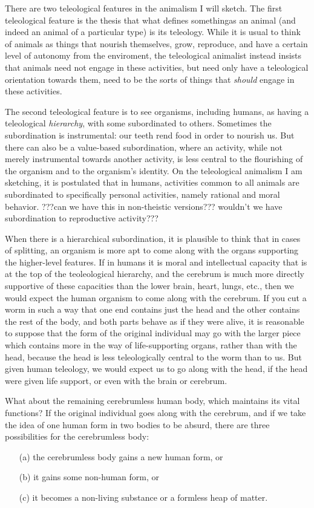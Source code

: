 There are two teleological features in the animalism I will sketch. The first teleological feature is the thesis 
that what defines somethingas an animal (and indeed an animal of a particular type) is its teleology. While it is usual to 
think of animals as things that nourish themselves, grow, reproduce, and have a certain level of autonomy from the enviroment, 
the teleological animalist instead insists that animals need not engage in these activities, but need only have a teleological
orientation towards them, need to be the sorts of things that \textit{should} engage in these activities. 

The second teleological feature is to see organisms, including humans, as having a teleological \textit{hierarchy}, with some
\tele{} subordinated to others. Sometimes the subordination is instrumental: our teeth rend food in order to nourish us. 
But there can also be a value-based subordination, where an activity, while not merely instrumental towards another activity, 
is less central to the flourishing of the organism and to the organism's identity. On the teleological animalism I am sketching,
it is postulated that in humans, activities common to all animals are subordinated to specifically personal activities, namely 
rational and moral behavior. ???can we have this in non-theistic versions??? wouldn't we have subordination to reproductive
activity???

When there is a hierarchical subordination, it is plausible to think that in cases of splitting, an organism is more apt
to come along with the organs supporting the higher-level features. If in humans it is moral and intellectual capacity 
that is at the top of the teoleological hierarchy, and the cerebrum is much more directly supportive of these capacities
than the lower brain, heart, lungs, etc., then we would expect the human organism to come along with the cerebrum. If you
cut a worm in such a way that one end contains just the head and the other contains the rest of the body, and both parts
behave as if they were alive, it is reasonable to suppose that the form of the original individual may go with the larger
piece which contains more in the way of life-supporting organs, rather than with the head, because the head is less 
teleologically central to the worm than to us. But given human teleology, we would expect us to go along with the head,
if the head were given life support, or even with the brain or cerebrum.

What about the remaining cerebrumless human body, which maintains its vital functions? If the original individual goes along
with the cerebrum, and if we take the idea of one human form in two bodies to be absurd, there are three possibilities 
for the cerebrumless body:
\begin{itemize}
\item[(a)] the cerebrumless body gains a new human form, or 
\item[(b)] it gains some non-human form, or 
\item[(c)] it becomes a non-living substance or a formless heap of matter. 
\end{itemize}

